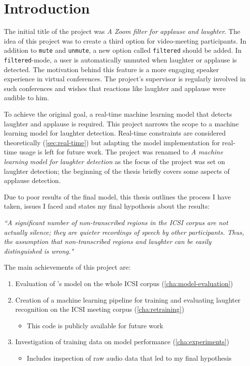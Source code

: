 \documentclass[bsc,frontabs,parskip,deptreport]{infthesis}
\begin{document}
\chapter{Introduction} \label{sec:intro}

The initial title of the project was \textit{A Zoom filter for applause and laughter}. The idea of this project was to create a third option for video-meeting participants. In addition to \texttt{mute} and \texttt{unmute}, a new option called \texttt{filtered} should be added.
In \texttt{filtered}-mode, a user is automatically unmuted when laughter or applause is detected. 
The motivation behind this feature is a more engaging speaker experience in virtual conferences. The project's supervisor is regularly involved in such conferences and wishes that reactions like laughter and applause were audible to him.

To achieve the original goal, a real-time machine learning model that detects laughter and applause is required.  
This project narrows the scope to a machine learning model for laughter detection. Real-time constraints are considered theoretically (\autoref{sec:real-time}) but adapting the model implementation for real-time usage is left for future work.
The project was renamed to \textit{A machine learning model for laughter detection} as the focus of the project was set on laughter detection; the beginning of the thesis briefly covers some aspects of applause detection. 

Due to poor results of the final model, this thesis outlines the process I have taken, issues I faced and states my final hypothesis about the results: 

\textit{``A significant number of non-transcribed regions in the ICSI corpus are not actually silence; they are quieter recordings of speech by other participants. Thus, the assumption that non-transcribed regions and laughter can be easily distinguished is wrong."}

The main achievements of this project are:
\begin{enumerate}
  \item Evaluation of \citeauthor{gillick2021robust}'s \citeyearpar{gillick2021robust} model on the whole ICSI corpus (\autoref{cha:model-evaluation})
  \item Creation of a machine learning pipeline for training and evaluating laughter recognition on the ICSI meeting corpus (\autoref{cha:retraining})
  \begin{itemize}
      \item This code is publicly available for future work \citep{Wolter_A_Machine_Learning_2022}
  \end{itemize}
  \item Investigation of training data on model performance (\autoref{cha:experiments})
  \begin{itemize}
      \item Includes inspection of raw audio data that led to my final hypothesis 
  \end{itemize}
\end{enumerate}
\end{document}
